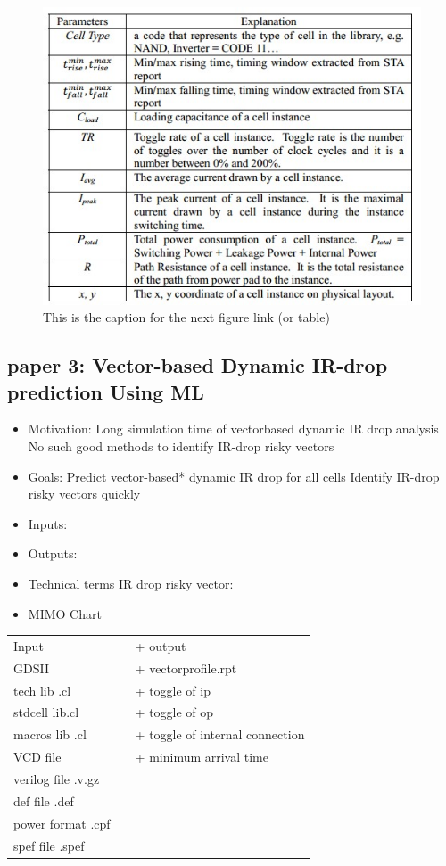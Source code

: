 \documentclass[a4paper]{article}
\begin{document}
\begin{figure}[htbp]
\centering
\includegraphics[width=.9\linewidth]{./img/p1.jpg}
\caption{\label{fig:orgfa4f187}This is the caption for the next figure link (or table)}
\end{figure}


\subsection{paper 3: Vector-based Dynamic IR-drop prediction Using ML}
\label{sec:org405f5f9}

\begin{itemize}
\item Motivation:
Long simulation time of vectorbased dynamic IR drop analysis
No such good methods to identify IR-drop risky vectors
\item Goals:
Predict vector-based* dynamic IR drop for all cells
Identify IR-drop risky vectors quickly

\item Inputs:

\item Outputs:

\item Technical terms
IR drop risky vector:

\item MIMO Chart
\end{itemize}

\begin{center}
\begin{tabular}{lll}
Input &  & + output\\
GDSII &  & + vectorprofile.rpt\\
tech lib .cl &  & + toggle of ip\\
stdcell lib.cl &  & + toggle of op\\
macros lib .cl &  & + toggle of internal connection\\
VCD file &  & + minimum arrival time\\
verilog file .v.gz &  & \\
def file   .def &  & \\
power format .cpf &  & \\
spef  file .spef &  & \\
\end{tabular}
\end{center}
\end{document}
